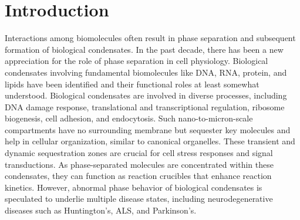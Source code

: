\documentclass{biophys-new}
\begin{document}
\section*{Introduction}

Interactions among biomolecules often result in phase separation and subsequent formation of biological condensates\cite{Banani2016}.
In the past decade, there has been a new appreciation for the role of phase separation in cell physiology\cite{Banani2017}. Biological condensates involving fundamental biomolecules like DNA\cite{Larson2017}, RNA\cite{Langdon2018}, protein\cite{Li2012}, and lipids\cite{Sezgin2017} have been identified and their functional roles at least somewhat understood.
Biological condensates are involved in diverse processes, including DNA damage response\cite{Altmeyer2015}, translational\cite{Decker2012} and transcriptional\cite{Lallemand-Breitenbach2010} regulation, ribosome biogenesis\cite{Feric2016}, cell adhesion\cite{Case2015}, and endocytosis\cite{Degreif2019}.
Such nano-to-micron-scale compartments have no surrounding membrane but sequester key molecules and help in cellular organization, similar to canonical organelles\cite{Mao2011,Boisvert2007}.
These transient and dynamic sequestration zones are crucial for cell stress responses\cite{Boisvert2007} and signal transductions\cite{Janosi2012}.
As phase-separated molecules are concentrated within these condensates, they can function as reaction crucibles that enhance reaction kinetics\cite{Strulson2012}.
However, abnormal phase behavior of biological condensates is speculated to underlie multiple disease states, including neurodegenerative diseases such as Huntington's\cite{Li2016}, ALS\cite{Jain2017}, and Parkinson's\cite{Ray2020}.
\end{document}

